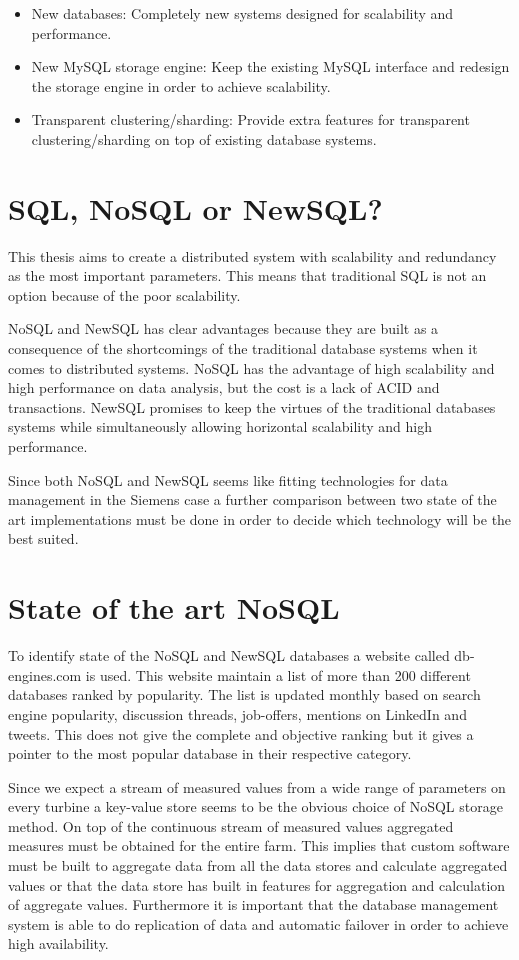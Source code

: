 \begin{itemize}
\item New databases: Completely new systems designed for scalability and performance.
\item New MySQL storage engine: Keep the existing MySQL interface and redesign the storage engine in order to achieve scalability.
\item Transparent clustering/sharding: Provide extra features for transparent clustering/sharding on top of existing database systems. 
\end{itemize}

\section{SQL, NoSQL or NewSQL?}
This thesis aims to create a distributed system with scalability and redundancy as the most important parameters.
This means that traditional SQL is not an option because of the poor scalability.

NoSQL and NewSQL has clear advantages because they are built as a consequence of the shortcomings of the traditional database systems when it comes to distributed systems.
NoSQL has the advantage of high scalability and high performance on data analysis, but the cost is a lack of ACID and transactions.
NewSQL promises to keep the virtues of the traditional databases systems while simultaneously allowing horizontal scalability and high performance.

Since both NoSQL and NewSQL seems like fitting technologies for data management in the Siemens case a further comparison between two state of the art implementations must be done in order to decide which technology will be the best suited.

\section{State of the art NoSQL}
To identify state of the NoSQL and NewSQL databases a website called db-engines.com\cite{db-engines} is used.
This website maintain a list of more than 200 different databases ranked by popularity. The list is updated monthly based on search engine popularity, discussion threads, job-offers, mentions on LinkedIn and tweets. This does not give the complete and objective ranking but it gives a pointer to the most popular database in their respective category.

Since we expect a stream of measured values from a wide range of parameters on every turbine a key-value store seems to be the obvious choice of NoSQL storage method. On top of the continuous stream of measured values aggregated measures must be obtained for the entire farm. This implies that custom software must be built to aggregate data from all the data stores and calculate aggregated values or that the data store has built in features for aggregation and calculation of aggregate values. Furthermore it is important that the database management system is able to do replication of data and automatic failover in order to achieve high availability.

